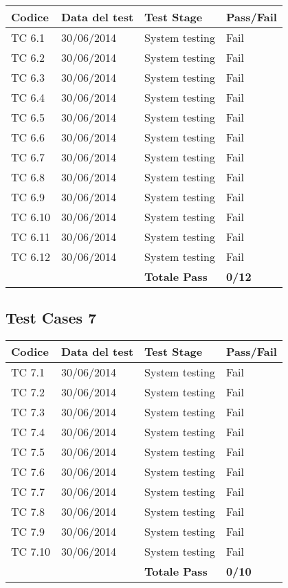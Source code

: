 \begin{tabular}{|p{3cm}|p{3cm}|p{3cm}|p{3cm}|}
	\hline
	\rowcolor{Gray}
	\textbf{Codice} & \textbf{Data del test} & \textbf{Test Stage} & \textbf{Pass/Fail}\tabularnewline
	\hline
	TC 6.1			& 30/06/2014 			& System testing		& Fail \tabularnewline
	\hline
	TC 6.2			& 30/06/2014 			& System testing		& Fail \tabularnewline
	\hline
	TC 6.3			& 30/06/2014 			& System testing		& Fail \tabularnewline
	\hline
	TC 6.4			& 30/06/2014 			& System testing		& Fail \tabularnewline
	\hline
	TC 6.5			& 30/06/2014 			& System testing		& Fail \tabularnewline
	\hline
	TC 6.6			& 30/06/2014 			& System testing		& Fail \tabularnewline
	\hline
	TC 6.7			& 30/06/2014 			& System testing		& Fail \tabularnewline
	\hline
	TC 6.8			& 30/06/2014 			& System testing		& Fail \tabularnewline
	\hline
	TC 6.9			& 30/06/2014 			& System testing		& Fail \tabularnewline
	\hline
	TC 6.10			& 30/06/2014 			& System testing		& Fail \tabularnewline
	\hline
	TC 6.11			& 30/06/2014 			& System testing		& Fail \tabularnewline
	\hline
	TC 6.12			& 30/06/2014 			& System testing		& Fail \tabularnewline
	\hline
					& 						& \textbf{Totale Pass}	& \textbf{0/12} \tabularnewline
	\hline
\end{tabular}

\subsection{Test Cases 7}

\begin{tabular}{|p{3cm}|p{3cm}|p{3cm}|p{3cm}|}
	\hline
	\rowcolor{Gray}
	\textbf{Codice} & \textbf{Data del test} & \textbf{Test Stage} & \textbf{Pass/Fail}\tabularnewline
	\hline
	TC 7.1			& 30/06/2014 			& System testing		& Fail \tabularnewline
	\hline
	TC 7.2			& 30/06/2014 			& System testing		& Fail \tabularnewline
	\hline
	TC 7.3			& 30/06/2014 			& System testing		& Fail \tabularnewline
	\hline
	TC 7.4			& 30/06/2014 			& System testing		& Fail \tabularnewline
	\hline
	TC 7.5			& 30/06/2014 			& System testing		& Fail \tabularnewline
	\hline
	TC 7.6			& 30/06/2014 			& System testing		& Fail \tabularnewline
	\hline
	TC 7.7			& 30/06/2014 			& System testing		& Fail \tabularnewline
	\hline
	TC 7.8			& 30/06/2014 			& System testing		& Fail \tabularnewline
	\hline
	TC 7.9			& 30/06/2014 			& System testing		& Fail \tabularnewline
	\hline
	TC 7.10			& 30/06/2014 			& System testing		& Fail \tabularnewline
	\hline
					& 						& \textbf{Totale Pass}	& \textbf{0/10} \tabularnewline
	\hline
\end{tabular}